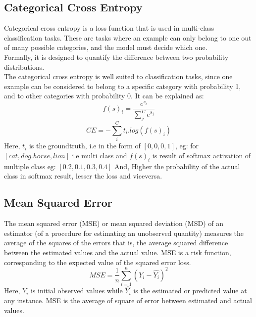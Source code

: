         \subsection{Categorical Cross Entropy}
            Categorical cross entropy is a loss function that is used in multi-class classification tasks. These are tasks where an example can only belong to one out of many possible categories, and the model must decide which one.\\
            Formally, it is designed to quantify the difference between two probability distributions.\\
            The categorical cross entropy is well suited to classification tasks, since one example can be considered to belong to a specific category with probability 1, and to other categories with probability 0.
            It can be explained as:
            \begin{equation}
                f(s)_i = \frac{e^{s_i}}{\sum^C_j e^{s_j}}
            \end{equation}
            \begin{equation}
                CE = - \sum^C_i t_i.log(f(s)_i)
            \end{equation}
            Here, ${t_i}$ is the groundtruth, i.e in the form of ${[0,0,0,1]}$, eg: for ${[cat, dog. horse, lion]}$ i.e multi class and ${f(s)_i}$ is result of softmax activation of multiple class eg: ${[0.2, 0.1, 0.3, 0.4]}$
            And, Higher the probability of the actual class in softmax result, lesser the loss and viceversa.

        \subsection{Mean Squared Error }
            The mean squared error (MSE) or mean squared deviation (MSD) of an estimator (of a procedure for estimating an unobserved quantity) measures the average of the squares of the errors that is, the average squared difference between the estimated values and the actual value. MSE is a risk function, corresponding to the expected value of the squared error loss. 
        \begin{equation}
            {MSE = \frac{1}{n}\sum^n_{i=1}(Y_i - \hat{Y_i})^2}
        \end{equation}
            Here, ${Y_i}$ is initial observed values while ${\hat{Y_i}}$ is the estimated or predicted value at any instance. MSE is the average of square of error between estimated and actual values.
